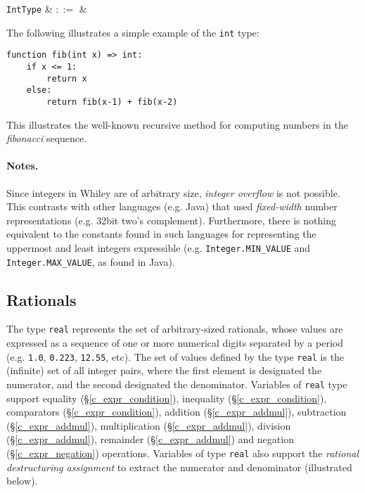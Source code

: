 \begin{syntax}
  \verb+IntType+ & $::=$ &  \\
\end{syntax}

\noindent The following illustrates a simple example of the \lstinline{int} type:

\begin{lstlisting}
function fib(int x) => int:
    if x <= 1:
        return x
    else:
        return fib(x-1) + fib(x-2)
\end{lstlisting}
This illustrates the well-known recursive method for computing numbers in the {\em fibonacci} sequence.

\paragraph{Notes.}  Since integers in Whiley are of arbitrary size, {\em integer overflow} is not possible.  This contrasts with other languages (e.g. Java) that used {\em fixed-width} number representations (e.g. 32bit two's complement).  Furthermore, there is nothing equivalent to the constants found in such languages for representing the uppermost and least integers expressible (e.g. \lstinline{Integer.MIN_VALUE} and \lstinline{Integer.MAX_VALUE}, as found in Java).

\subsection{Rationals}
\label{c_types_real}

The type \lstinline{real} represents the set of arbitrary-sized rationals, whose values are expressed as a sequence of one or more numerical digits separated by a period (e.g. \lstinline{1.0}, \lstinline{0.223}, \lstinline{12.55}, etc).  The set of values defined by the type \lstinline{real} is the (infinite) set of all integer pairs, where the first element is designated the numerator, and the second designated the denominator.  Variables of \lstinline{real} type support equality (\S\ref{c_expr_condition}), inequality (\S\ref{c_expr_condition}), comparators (\S\ref{c_expr_condition}), addition (\S\ref{c_expr_addmul}), subtraction (\S\ref{c_expr_addmul}), multiplication (\S\ref{c_expr_addmul}), division (\S\ref{c_expr_addmul}), remainder (\S\ref{c_expr_addmul}) and negation (\S\ref{c_expr_negation}) operations.  Variables of type \lstinline{real} also support the {\em rational destructuring assignment} to extract the numerator and denominator (illustrated below).

